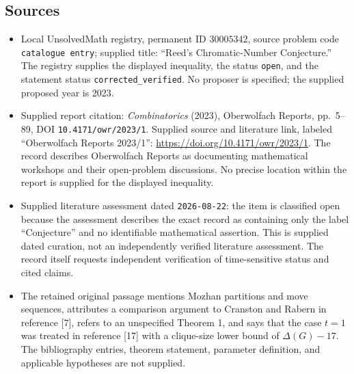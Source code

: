\documentclass[11pt]{article}
\begin{document}
\subsection{Sources}
\begin{itemize}
\item Local UnsolvedMath registry, permanent ID \(30005342\), source problem code \texttt{catalogue entry}; supplied title: ``Reed's Chromatic-Number Conjecture.'' The registry supplies the displayed inequality, the status \texttt{open}, and the statement status \texttt{corrected\_verified}. No proposer is specified; the supplied proposed year is 2023.
\item Supplied report citation: \emph{Combinatorics} (2023), Oberwolfach Reports, pp.~5--89, DOI \texttt{10.4171/owr/2023/1}. Supplied source and literature link, labeled ``Oberwolfach Reports 2023/1'': \url{https://doi.org/10.4171/owr/2023/1}. The record describes Oberwolfach Reports as documenting mathematical workshops and their open-problem discussions. No precise location within the report is supplied for the displayed inequality.
\item Supplied literature assessment dated \texttt{2026-08-22}: the item is classified open because the assessment describes the exact record as containing only the label ``Conjecture'' and no identifiable mathematical assertion. This is supplied dated curation, not an independently verified literature assessment. The record itself requests independent verification of time-sensitive status and cited claims.
\item The retained original passage mentions Mozhan partitions and move sequences, attributes a comparison argument to Cranston and Rabern in reference [7], refers to an unspecified Theorem 1, and says that the case \(t=1\) was treated in reference [17] with a clique-size lower bound of \(\Delta(G)-17\). The bibliography entries, theorem statement, parameter definition, and applicable hypotheses are not supplied.
\end{itemize}
\end{document}
